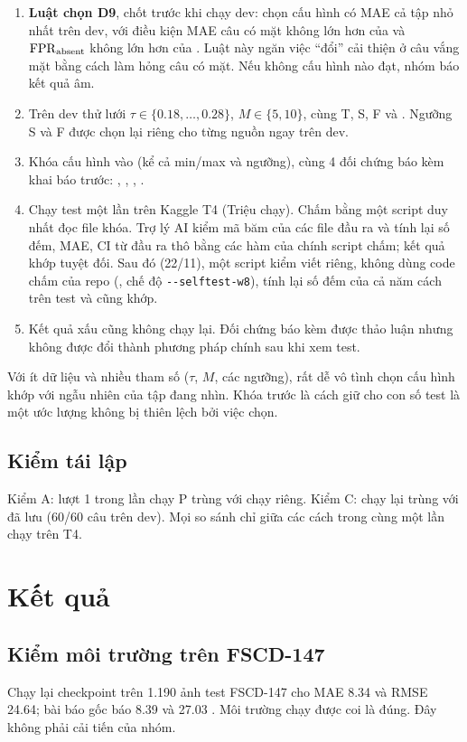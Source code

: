 \documentclass[12pt,a4paper]{article}
\begin{document}
\begin{enumerate}
\item \textbf{Luật chọn D9}, chốt trước khi chạy dev: chọn cấu hình có MAE cả tập nhỏ nhất trên dev, với điều kiện MAE câu có mặt không lớn hơn của \Bzero{} và $\mathrm{FPR}_{\text{absent}}$ không lớn hơn của \Bzero. Luật này ngăn việc ``đổi'' cải thiện ở câu vắng mặt bằng cách làm hỏng câu có mặt. Nếu không cấu hình nào đạt, nhóm báo kết quả âm.
\item Trên dev thử lưới $\tau\in\{0.18,\dots,0.28\}$, $M\in\{5,10\}$, cùng T, S, F và \Csix. Ngưỡng S và F được chọn lại riêng cho từng nguồn ngay trên dev.
\item Khóa cấu hình vào  (kể cả min/max và ngưỡng), cùng 4 đối chứng báo kèm khai báo trước: \Bzero, \Btwo, \Csix, \BtwoF.
\item Chạy test một lần trên Kaggle T4 (Triệu chạy). Chấm bằng một script duy nhất đọc file khóa. Trợ lý AI kiểm mã băm của các file đầu ra và tính lại số đếm, MAE, CI từ đầu ra thô bằng các hàm của chính script chấm; kết quả khớp tuyệt đối. Sau đó (22/11), một script kiểm viết riêng, không dùng code chấm của repo (, chế độ \texttt{-{}-selftest-w8}), tính lại số đếm của cả năm cách trên test và cũng khớp.
\item Kết quả xấu cũng không chạy lại. Đối chứng báo kèm được thảo luận nhưng không được đổi thành phương pháp chính sau khi xem test.
\end{enumerate}
Với ít dữ liệu và nhiều tham số ($\tau$, $M$, các ngưỡng), rất dễ vô tình chọn cấu hình khớp với ngẫu nhiên của tập đang nhìn. Khóa trước là cách giữ cho con số test là một ước lượng không bị thiên lệch bởi việc chọn.

\subsection{Kiểm tái lập}
Kiểm A: lượt 1 trong lần chạy P trùng với \Bzero{} chạy riêng. Kiểm C: \Btwo{} chạy lại trùng với \Btwo{} đã lưu (60/60 câu trên dev). Mọi so sánh chỉ giữa các cách trong cùng một lần chạy trên T4.

\section{Kết quả}\label{sec:results}

\subsection{Kiểm môi trường trên FSCD-147}
Chạy lại checkpoint \cgdpp{} trên 1.190 ảnh test FSCD-147 cho MAE 8.34 và RMSE 24.64; bài báo gốc báo 8.39 và 27.03 \parencite{aminiNaieni2025countgdpp}. Môi trường chạy được coi là đúng. Đây không phải cải tiến của nhóm.
\end{document}
